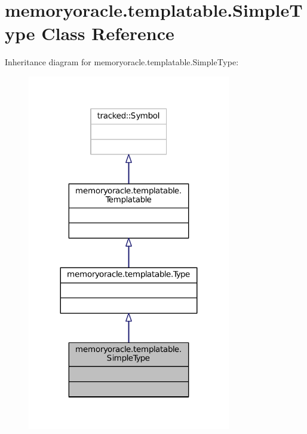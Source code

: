\hypertarget{classmemoryoracle_1_1templatable_1_1SimpleType}{}\section{memoryoracle.\+templatable.\+Simple\+Type Class Reference}
\label{classmemoryoracle_1_1templatable_1_1SimpleType}


Inheritance diagram for memoryoracle.\+templatable.\+Simple\+Type\+:\nopagebreak
\begin{figure}[H]
\begin{center}
\leavevmode
\includegraphics[width=251pt]{classmemoryoracle_1_1templatable_1_1SimpleType__inherit__graph}
\end{center}
\end{figure}


